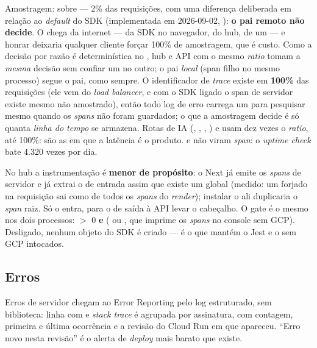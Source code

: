 Amostragem:  sobre  --- 2\% das
requisições, com uma diferença deliberada em relação ao \emph{default} do SDK
(implementada em 2026-09-02, ): \textbf{o
pai remoto não decide}. O  chega da internet --- da SDK no
navegador, do hub, de um  --- e honrar  deixaria
qualquer cliente forçar 100\% de amostragem, que é custo. Como a decisão por
razão é determinística no , hub e API com o mesmo \emph{ratio}
tomam a \emph{mesma} decisão sem confiar um no outro; o pai \emph{local}
(span filho no mesmo processo) segue o pai, como sempre. O identificador de
\emph{trace} existe em \textbf{100\%} das requisições (ele vem do
\emph{load balancer}, e com o SDK ligado o span de servidor existe mesmo
não amostrado), então todo log de erro carrega um  para pesquisar
mesmo quando os \emph{spans} não foram guardados; o que a amostragem decide
é só quanta \emph{linha do tempo} se armazena. Rotas de IA
(, , , ) e
 usam dez vezes o \emph{ratio}, até 100\%: são as em
que a latência é o produto.  e  não viram
\emph{span}: o \emph{uptime check} bate 4.320 vezes por dia.

No hub a instrumentação é \textbf{menor de propósito}: o Next já emite os
\emph{spans} de servidor e já extrai o  de entrada assim que
existe um  global (medido: um  forjado na
requisição sai como  de todos os \emph{spans} do \emph{render});
instalar o  ali duplicaria o \emph{span} raiz. Só o
 entra, para o  de saída à API levar o cabeçalho. O gate
é o mesmo nos dois processos:  \(>\) 0 \textbf{e}
( ou , que imprime os \emph{spans} no
console sem GCP). Desligado, nenhum objeto do SDK é criado --- é o que mantém
o Jest e o  sem GCP intocados.

\subsection{Erros}

Erros de servidor chegam ao Error Reporting pelo log estruturado, sem
biblioteca: linha com  e \emph{stack trace} é agrupada
por assinatura, com contagem, primeira e última ocorrência e a revisão do
Cloud Run em que apareceu. \enquote{Erro novo nesta revisão} é o alerta de
\emph{deploy} mais barato que existe.

